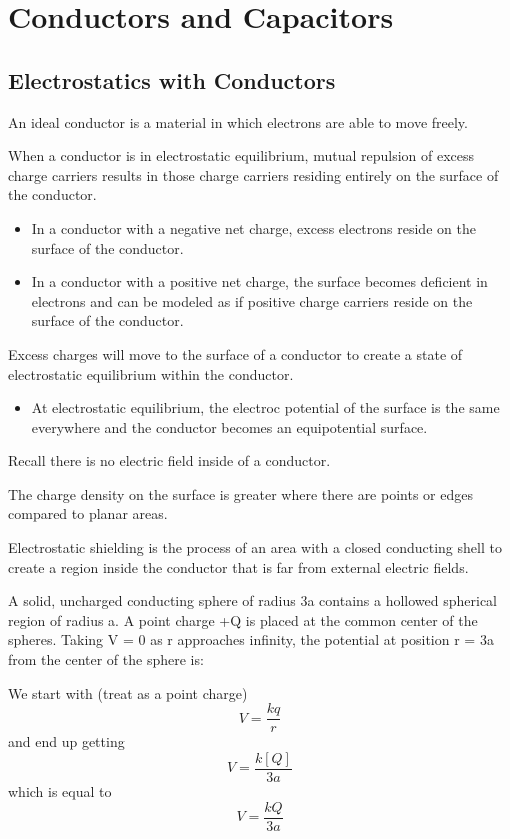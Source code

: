 \documentclass[../em.tex]{subfiles}
\begin{document}
\chapter{Conductors and Capacitors}
\section{Electrostatics with Conductors}
An ideal conductor is a material in which electrons are able to move freely.

When a conductor is in electrostatic equilibrium, mutual repulsion of excess 
charge carriers results in those charge carriers residing entirely on the surface of the conductor.
\begin{itemize}
    \item In a conductor with a negative net charge, excess electrons reside on the surface of the conductor.
    \item In a conductor with a positive net charge, the surface becomes deficient in electrons and can be modeled as if positive charge carriers reside on the surface of the conductor.
\end{itemize}

Excess charges will move to the surface of a conductor to create a state of electrostatic equilibrium within the conductor.
\begin{itemize}
    \item At electrostatic equilibrium, the electroc potential of the surface is the same everywhere and the conductor becomes an equipotential surface.
\end{itemize}

Recall there is no electric field inside of a conductor.

The charge density on the surface is greater where there are points or edges compared to planar areas.

Electrostatic shielding is the process of an area with a closed conducting shell to 
create a region inside the conductor that is far from external electric fields.

\begin{example}
    A solid, uncharged conducting sphere of radius 3a contains a hollowed spherical region of radius a.
    A point charge +Q is placed at the common center of the spheres. Taking V = 0 as r approaches infinity,
    the potential at position r = 3a from the center of the sphere is:

    We start with (treat as a point charge)
    \[V=\frac{kq}{r}\]
    and end up getting 
    \[V=\frac{k[Q]}{3a}\]
    which is equal to 
    \[V=\frac{kQ}{3a}\]  
\end{example}
\end{document}

